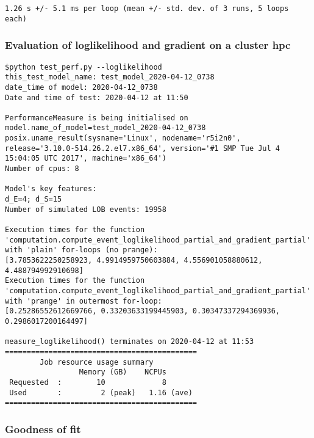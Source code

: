 \documentclass[10pt, article,table]{article}
\makeatletter
\newcommand{\boxspacing}{\kern\kvtcb@left@rule\kern\kvtcb@boxsep}
\newcommand{\prompt}[4]{
        \ttfamily\llap{{\color{#2}[#3]:\hspace{3pt}#4}}\vspace{-\baselineskip}
    }
\makeatother
\begin{document}
\begin{tcolorbox}[breakable, size=fbox, boxrule=.5pt, pad at break*=1mm, opacityfill=0]
\prompt{Out}{outcolor}{5}{\boxspacing}
\begin{Verbatim}[commandchars=\\\{\}, fontsize=\small]
1.26 s +/- 5.1 ms per loop (mean +/- std. dev. of 3 runs, 5 loops each)
    \end{Verbatim}
\end{tcolorbox}
\subsubsection*{Evaluation of loglikelihood and gradient on a cluster hpc}    
\begin{tcolorbox}[breakable, size=fbox, boxrule=1pt, pad at break*=1mm,colframe=cellborder]    
\begin{Verbatim}[commandchars=\\\{\}, fontsize=\small]
 $python test_perf.py --loglikelihood
this_test_model_name: test_model_2020-04-12_0738
date_time of model: 2020-04-12_0738
Date and time of test: 2020-04-12 at 11:50

PerformanceMeasure is being initialised on model.name_of_model=test_model_2020-04-12_0738
posix.uname_result(sysname='Linux', nodename='r5i2n0', release='3.10.0-514.26.2.el7.x86_64', version='#1 SMP Tue Jul 4 15:04:05 UTC 2017', machine='x86_64')
Number of cpus: 8

Model's key features:
d_E=4; d_S=15
Number of simulated LOB events: 19958

Execution times for the function 'computation.compute_event_loglikelihood_partial_and_gradient_partial' with 'plain' for-loops (no prange):
[3.7853622250258923, 4.9914959750603884, 4.556901058880612, 4.488794992910698]
Execution times for the function 'computation.compute_event_loglikelihood_partial_and_gradient_partial' with 'prange' in outermost for-loop:
[0.25286552612669766, 0.33203633199445903, 0.30347337294369936, 0.2986017200164497]

measure_loglikelihood() terminates on 2020-04-12 at 11:53
============================================
        Job resource usage summary 
                 Memory (GB)    NCPUs
 Requested  :        10             8
 Used       :         2 (peak)   1.16 (ave)
============================================
\end{Verbatim}
\end{tcolorbox}


\subsubsection{Goodness of fit}
\end{document}
